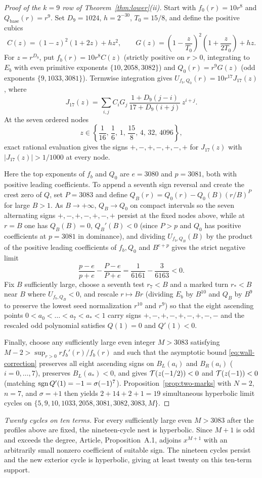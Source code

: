 \begin{proof}[Proof of the $k=9$ row of Theorem~\ref{thm:lower}\textup{(ii)}]
Start with $f_0(r)=10r^8$ and $Q_{\mathrm{base}}(r)=r^9$. Set $D_9=1024$, $h=2^{-30}$, $T_0=15/8$, and define the positive cubics
\[
  C(z) = (1-z)^2(1+2z) + h z^2, \qquad G(z) = \left(1-\frac{z}{T_0}\right)^2\left(1+\frac{z}{2T_0}\right) + h z.
\]
For $z=r^{D_9}$, put $f_b(r)=10r^8 C(z)$ (strictly positive on $r>0$, integrating to $E_b$ with even
primitive exponents $\{10,2058,3082\}$) and $Q_0(r)=r^9 G(z)$ (odd exponents $\{9,1033,3081\}$).
Termwise integration gives $U_{f_b,Q_0}(r)=10 r^{17} J_{17}(z)$, where
\[
  J_{17}(z) = \sum_{i,j} C_i G_j\,\frac{1 + D_9(j-i)}{17 + D_9(i+j)}\,z^{i+j}.
\]
At the seven ordered nodes
\[
  z \in \left\{\frac{1}{16},\, \frac{1}{6},\, 1,\, \frac{15}{8},\, 4,\, 32,\, 4096\right\},
\]
exact rational evaluation gives the signs $+,-,+,-,+,-,+$ for $J_{17}(z)$ with $|J_{17}(z)|>1/1000$ at every node.

Here the top exponents of $f_b$ and $Q_0$ are $e=3080$ and $p=3081$, both with positive leading
coefficients. To append a seventh sign reversal and create the crest zero of $Q$, set $P=3083$ and
define $Q_B(r)=Q_0(r)-Q_0(B)(r/B)^P$ for large $B>1$. As $B\to+\infty$, $Q_B\to Q_0$ on compact
intervals so the seven alternating signs $+,-,+,-,+,-,+$ persist at the fixed nodes above, while at
$r=B$ one has $Q_B(B)=0$, $Q_B'(B)<0$ (since $P>p$ and $Q_0$ has positive coefficients at $p=3081$ in
dominance), and dividing $U_{f_b,Q_B}(B)$ by the product of the positive leading coefficients of
$f_b,Q_0$ and $B^{e+p}$ gives the strict negative limit
\[
  \frac{p-e}{p+e} - \frac{P-e}{P+e} = \frac{1}{6161} - \frac{3}{6163} < 0.
\]
Fix $B$ sufficiently large, choose a seventh test $r_7<B$ and a marked turn $r_*<B$ near $B$ where
$U_{f_b,Q_B}<0$, and rescale $r\mapsto Br$ (dividing $E_b$ by $B^{10}$ and $Q_B$ by $B^9$ to preserve
the lowest seed normalization $r^{10}$ and $r^9$) so that the eight ascending points
$0<a_0<\dots<a_7<a_*<1$ carry signs $+,-,+,-,+,-,+,-,-$ and the rescaled odd polynomial satisfies
$Q(1)=0$ and $Q'(1)<0$.

Finally, choose any sufficiently large even integer $M>3083$ satisfying
$M-2>\sup_{r>0}rf_b'(r)/f_b(r)$ and such that the asymptotic bound \eqref{eq:wall-correction}
preserves all eight ascending signs on $B_L(a_i)$ and $B_R(a_i)$ ($i=0,\dots,7$), preserves
$B_L(a_*)<0$, and gives $\mathcal{T}(z(-1/2))<0$ and $\mathcal{T}(z(-1))<0$ (matching $\operatorname{sgn} Q'(1)=-1=\sigma(-1)^7$).
Proposition~\ref{prop:two-marks} with $N=2$, $n=7$, and $\sigma=+1$ then yields $2+14+2+1=19$
simultaneous hyperbolic limit cycles on $\{5,9,10,1033,2058,3081,3082,3083,M\}$.
\end{proof}

\smallskip\noindent\emph{Twenty cycles on ten terms.}
For every sufficiently large even $M>3083$ after the profiles above
are fixed, the nineteen-cycle nest is hyperbolic. Since $M+1$ is odd
and exceeds the degree, Article, Proposition~A.1, adjoins $x^{M+1}$
with an arbitrarily small nonzero coefficient of suitable sign.
The nineteen cycles persist and the new exterior cycle is hyperbolic,
giving at least twenty on this ten-term support.
